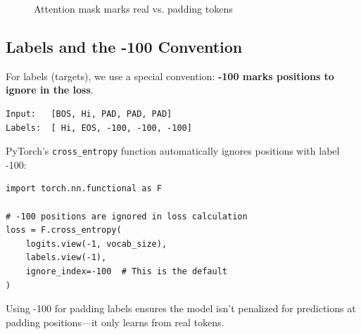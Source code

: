 \begin{figure}[H]
\centering
{}
\caption{Attention mask marks real vs. padding tokens}
\label{fig:attention-mask}
\end{figure}

\subsection{Labels and the -100 Convention}

For labels (targets), we use a special convention: \textbf{-100 marks positions to ignore in the loss}.

\begin{lstlisting}[style=shell, numbers=none]
Input:   [BOS, Hi, PAD, PAD, PAD]
Labels:  [ Hi, EOS, -100, -100, -100]
\end{lstlisting}

PyTorch's \texttt{cross\_entropy} function automatically ignores positions with label -100:

\begin{lstlisting}[style=python]
import torch.nn.functional as F

# -100 positions are ignored in loss calculation
loss = F.cross_entropy(
    logits.view(-1, vocab_size),
    labels.view(-1),
    ignore_index=-100  # This is the default
)
\end{lstlisting}

\begin{keypoint}
Using -100 for padding labels ensures the model isn't penalized for predictions at padding positions---it only learns from real tokens.
\end{keypoint}

